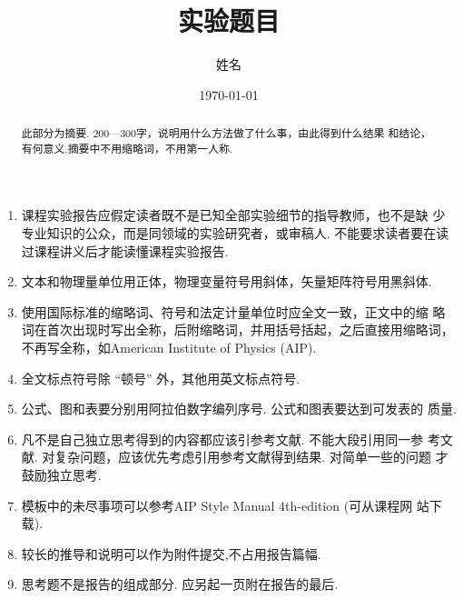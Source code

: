 \documentclass[aps,pre,12pt,preprint,onecolumn,showpacs,showkeys]{revtex4-1}
\newcommand{\fssfour}{\fontsize{12.05}{14.45}\selectfont}
\newcommand{\fsfour}{\fontsize{14.05}{16.86}\selectfont}
\newcommand{\fsthree}{\fontsize{16.06}{19.27}\selectfont}
\begin{document}
\title{\bf\heiti\fsthree 实验题目\vspace{15mm}}
\author{\fangsong\fsfour 姓名\vspace{2mm}}
\affiliation{\normalfont\fssfour 年级~~~~学号\vspace{2mm}}
\date{\today}

\begin{abstract}
  \vspace{10mm}
  \begin{spacing}{1.5}
    \fssfour
    此部分为摘要. 200—300字，说明用什么方法做了什么事，由此得到什么结果
和结论，有何意义.摘要中不用缩略词，不用第一人称.
  \end{spacing}
\end{abstract}

\maketitle
\fssfour

\begin{enumerate}
\item 课程实验报告应假定读者既不是已知全部实验细节的指导教师，也不是缺
少专业知识的公众，而是同领域的实验研究者，或审稿人. 不能要求读者要在读
过课程讲义后才能读懂课程实验报告.
\item 文本和物理量单位用正体，物理变量符号用斜体，矢量矩阵符号用黑斜体.
\item 使用国际标准的缩略词、符号和法定计量单位时应全文一致，正文中的缩
略词在首次出现时写出全称，后附缩略词，并用括号括起，之后直接用缩略词，
不再写全称，如American Institute of Physics (AIP).
\item 全文标点符号除 “顿号” 外，其他用英文标点符号.
\item 公式、图和表要分别用阿拉伯数字编列序号. 公式和图表要达到可发表的
质量.
\item 凡不是自己独立思考得到的内容都应该引参考文献. 不能大段引用同一参
考文献. 对复杂问题，应该优先考虑引用参考文献得到结果. 对简单一些的问题
才鼓励独立思考.
\item 模板中的未尽事项可以参考AIP Style Manual 4th-edition (可从课程网
站下载).
\item 较长的推导和说明可以作为附件提交,不占用报告篇幅.
\item 思考题不是报告的组成部分. 应另起一页附在报告的最后.
\end{enumerate}
\end{document}
